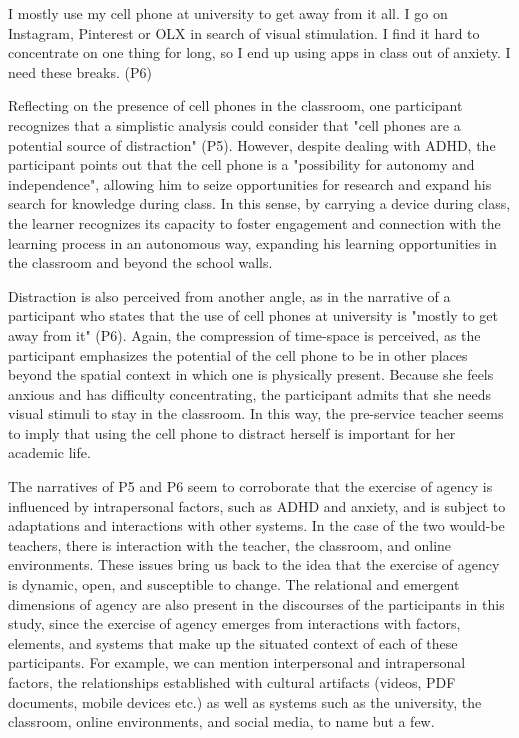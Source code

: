 I mostly use my cell phone at university to get away from it all. I go on Instagram, Pinterest or OLX in search of visual stimulation. I find it hard to concentrate on one thing for long, so I end up using apps in class out of anxiety. I need these breaks. (P6)

Reflecting on the presence of cell phones in the classroom, one participant recognizes that a simplistic analysis could consider that "cell phones are a potential source of distraction" (P5). However, despite dealing with ADHD, the participant points out that the cell phone is a "possibility for autonomy and independence", allowing him to seize opportunities for research and expand his search for knowledge during class. In this sense, by carrying a device during class, the learner recognizes its capacity to foster engagement and connection with the learning process in an autonomous way, expanding his learning opportunities in the classroom and beyond the school walls.


Distraction is also perceived from another angle, as in the narrative of a participant who states that the use of cell phones at university is "mostly to get away from it" (P6). Again, the compression of time-space is perceived, as the participant emphasizes the potential of the cell phone to be in other places beyond the spatial context in which one is physically present. Because she feels anxious and has difficulty concentrating, the participant admits that she needs visual stimuli to stay in the classroom. In this way, the pre-service teacher seems to imply that using the cell phone to distract herself is important for her academic life.

The narratives of P5 and P6 seem to corroborate that the exercise of agency is influenced by intrapersonal factors, such as ADHD and anxiety, and is subject to adaptations and interactions with other systems. In the case of the two would-be teachers, there is interaction with the teacher, the classroom, and online environments. These issues bring us back to the idea that the exercise of agency is dynamic, open, and susceptible to change. The relational and emergent dimensions of agency are also present in the discourses of the participants in this study, since the exercise of agency emerges from interactions with factors, elements, and systems that make up the situated context of each of these participants. For example, we can mention interpersonal and intrapersonal factors, the relationships established with cultural artifacts (videos, PDF documents, mobile devices etc.) as well as systems such as the university, the classroom, online environments, and social media, to name but a few.
